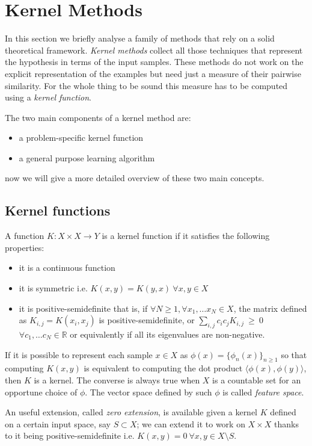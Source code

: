 \section{Kernel Methods}
\label{sec:kernel}

In this section we briefly analyse a family of methods that rely on a solid
theoretical framework.
\emph{Kernel methods} collect all those techniques that represent the hypothesis
in terms of the input samples.
These methods do not work on the explicit representation of the examples but
need just a measure of their pairwise similarity.
For the whole thing to be sound this measure has to be computed using a
\emph{kernel function}.

The two main components of a kernel method are:
\begin{itemize}
    \item a problem-specific kernel function
    \item a general purpose learning algorithm
\end{itemize}
now we will give a more detailed overview of these two main concepts.

\subsection{Kernel functions}
\label{subsec:kernelfunc}
A function $K:X\times X \to Y$ is a kernel function if it satisfies the following properties:
\begin{itemize}
    \item it is a continuous function
    \item it is symmetric i.e. $K(x,y) = K(y,x)~\forall x,y \in X$
    \item it is positive-semidefinite that is, if $\forall N\geq 1, \forall x_1,\dots x_N \in X$,
        the matrix defined as $K_{i,j} = K(x_i,x_j)$ is positive-semidefinite,
        or $\sum_{i,j}c_ic_jK_{i,j}~\geq~0$ $\forall c_1,\dots c_N \in \mathbb{R}$
        or equivalently if all its eigenvalues are non-negative.
\end{itemize}

If it is possible to represent each sample $x \in X$ as $\phi(x) = \{\phi_n(x)\}_{n \geq 1}$
so that computing $K(x,y)$ is equivalent to computing the dot product $\langle
\phi(x),\phi(y)\rangle$, then $K$ is a kernel.
The converse is always true when $X$ is a countable set for an opportune choice
of $\phi$.
The vector space defined by such $\phi$ is called \emph{feature space}.

An useful extension, called \emph{zero extension}, is available given a kernel $K$
defined on a certain input space, say $S\subset X$; we can extend it to work
on $X\times X$ thanks to it being positive-semidefinite i.e.
$K(x,y)=0~\forall x,y \in X\setminus S$.

